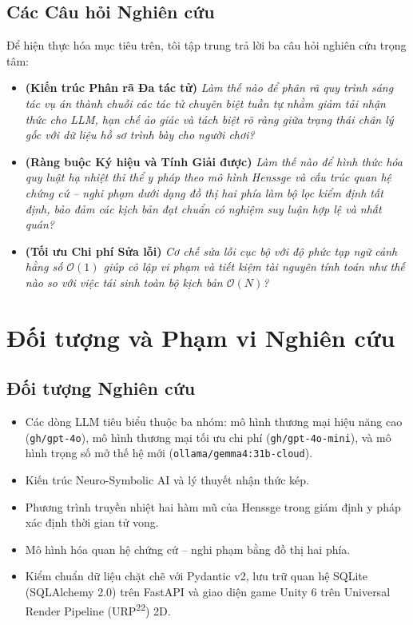 \subsection{Các Câu hỏi Nghiên cứu}
Để hiện thực hóa mục tiêu trên, tôi tập trung trả lời ba câu hỏi nghiên cứu trọng tâm:

\begin{itemize}[leftmargin=1.5cm]
    \item[\textbf{RQ1:}] \textbf{(Kiến trúc Phân rã Đa tác tử)} \textit{Làm thế nào để phân rã quy trình sáng tác vụ án thành chuỗi các tác tử chuyên biệt tuần tự nhằm giảm tải nhận thức cho LLM, hạn chế ảo giác và tách biệt rõ ràng giữa trạng thái chân lý gốc với dữ liệu hồ sơ trình bày cho người chơi?}
    
    \item[\textbf{RQ2:}] \textbf{(Ràng buộc Ký hiệu và Tính Giải được)} \textit{Làm thế nào để hình thức hóa quy luật hạ nhiệt thi thể y pháp theo mô hình Henssge và cấu trúc quan hệ chứng cứ -- nghi phạm dưới dạng đồ thị hai phía làm bộ lọc kiểm định tất định, bảo đảm các kịch bản đạt chuẩn có nghiệm suy luận hợp lệ và nhất quán?}
    
    \item[\textbf{RQ3:}] \textbf{(Tối ưu Chi phí Sửa lỗi)} \textit{Cơ chế sửa lỗi cục bộ với độ phức tạp ngữ cảnh hằng số $\mathcal{O}(1)$ giúp cô lập vi phạm và tiết kiệm tài nguyên tính toán như thế nào so với việc tái sinh toàn bộ kịch bản $\mathcal{O}(N)$?}
\end{itemize}

\section{Đối tượng và Phạm vi Nghiên cứu}
\label{sec:intro_scope}

\subsection{Đối tượng Nghiên cứu}
\begin{itemize}[leftmargin=1.5cm]
    \item Các dòng LLM tiêu biểu thuộc ba nhóm: mô hình thương mại hiệu năng cao (\texttt{gh/gpt-4o}), mô hình thương mại tối ưu chi phí (\texttt{gh/gpt-4o-mini}), và mô hình trọng số mở thế hệ mới (\texttt{ollama/gemma4:31b-cloud}).
    \item Kiến trúc Neuro-Symbolic AI và lý thuyết nhận thức kép.
    \item Phương trình truyền nhiệt hai hàm mũ của Henssge trong giám định y pháp xác định thời gian tử vong.
    \item Mô hình hóa quan hệ chứng cứ -- nghi phạm bằng đồ thị hai phía.
    \item Kiểm chuẩn dữ liệu chặt chẽ với Pydantic v2, lưu trữ quan hệ SQLite (SQLAlchemy 2.0) trên FastAPI và giao diện game Unity 6 trên Universal Render Pipeline (URP\textsuperscript{22}) 2D.
\end{itemize}

